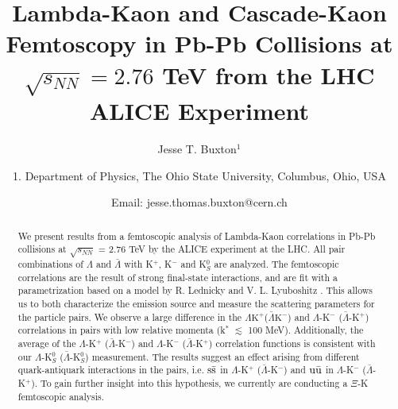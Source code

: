 \documentclass[ALICE,manyauthors]{ALICE_analysis_notes}
\newcommand{\LamKchP}{$\Lambda\mathrm{K^{+}}$\xspace}
\newcommand{\ALamKchM}{$\bar{\Lambda}\mathrm{K^{-}}$\xspace}
\begin{document}
%
%
%
\begin{titlepage}
%
\PHdate{\today}
%
\title{Lambda-Kaon and Cascade-Kaon Femtoscopy in Pb-Pb Collisions at $\sqrt{s_{NN}}=2.76$ TeV from the LHC ALICE Experiment}
%
\author{Jesse T. Buxton$^{1}$}
\author{
1. Department of Physics, The Ohio State University, Columbus, Ohio, USA\\
}
\author{Email: jesse.thomas.buxton@cern.ch}
%
%
\begin{abstract}

\begin{comment}
My abstract will be contained here.  The abstract will introduce my study and inform the reader about the content of this paper.  I will state the problem I tackle, and summarize (in one sentence) why no one else has yet to adequately answered the research question.  Next, I will explain (again, in one sentence) how I tackled the research question, and (in one sentence) how I went about doing the research which followed from this big idea (i.e. elaborate on previous sentence).  Finally, as a single sentence, I will state the key impact of my research.
\end{comment}

\linenumbers

We present results from a femtoscopic analysis of Lambda-Kaon correlations in Pb-Pb collisions at $\sqrt{s_{NN}}$ = 2.76 TeV by the ALICE experiment at the LHC.  
All pair combinations of $\Lambda$ and $\bar{\Lambda}$ with K$^{+}$, K$^{-}$ and K$^{0}_{S}$ are analyzed.  
The femtoscopic correlations are the result of strong final-state interactions, and are fit with a parametrization based on a model by R. Lednicky and V. L. Lyuboshitz \cite{Lednicky:82}.  
This allows us to both characterize the emission source and measure the scattering parameters for the particle pairs.  
We observe a large difference in the \LamKchP (\ALamKchM) and $\Lambda$-K$^{-}$ ($\bar{\Lambda}$-K$^{+}$) correlations in pairs with low relative momenta (k$^{*}$ $\lesssim$ 100 MeV).  
Additionally, the average of the $\Lambda$-K$^{+}$ ($\bar{\Lambda}$-K$^{-}$) and $\Lambda$-K$^{-}$ ($\bar{\Lambda}$-K$^{+}$) correlation functions is consistent with our $\Lambda$-K$^{0}_{S}$ ($\bar{\Lambda}$-K$^{0}_{S}$) measurement.  
The results suggest an effect arising from different quark-antiquark interactions in the pairs, i.e. $\rm s\bar{s}$ in $\Lambda$-K$^{+}$ ($\bar{\Lambda}$-K$^{-}$) and $\rm u\bar{u}$ in $\Lambda$-K$^{-}$ ($\bar{\Lambda}$-K$^{+}$).  
To gain further insight into this hypothesis, we currently are conducting a $\Xi$-K femtoscopic analysis.
\end{abstract}
\end{titlepage}
%
%

\clearpage


\end{document}
